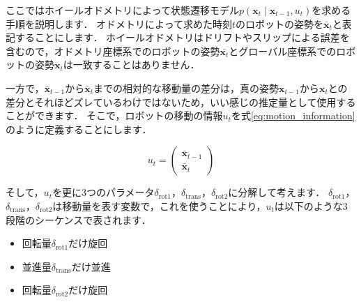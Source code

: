 \documentclass[{../../master}]{subfiles}
\begin{document}
ここではホイールオドメトリによって状態遷移モデル$p(\bm{x}_{t} \mid \bm{x}_{t-1}, u_{t})$を求める手順を説明します．
オドメトリによって求めた時刻$t$のロボットの姿勢を$\bar{\bm{x}}_{t}$と表記することにします．
ホイールオドメトリはドリフトやスリップによる誤差を含むので，オドメトリ座標系でのロボットの姿勢$\bar{\bm{x}_{t}}$とグローバル座標系でのロボットの姿勢$\bm{x}_{t}$は一致することはありません．

一方で，$\bar{\bm{x}}_{t-1}$から$\bar{\bm{x}}_{t}$までの相対的な移動量の差分は，真の姿勢$\bm{x}_{t-1}$から$\bm{x}_{t}$との差分とそれほどズレているわけではないため，いい感じの推定量として使用することができます．
そこで，ロボットの移動の情報$u_{t}$を式\ref{eq:motion_information}のように定義することにします．

\begin{equation}
  u_{t} =
  \begin{pmatrix}
    \bar{\bm{x}}_{t-1} \\
    \bar{\bm{x}}_{t}
  \end{pmatrix}
  \label{eq:motion_information}
\end{equation}

そして，$u_{t}$を更に3つのパラメータ$\delta_{\text{rot}1}$，$\delta_{\text{trans}}$，$\delta_{\text{rot}2}$に分解して考えます．
$\delta_{\text{rot}1}$，$\delta_{\text{trans}}$，$\delta_{\text{rot}2}$は移動量を表す変数で，これを使うことにより，$u_{t}$は以下のような3段階のシーケンスで表されます．

\begin{itemize}
  \item 回転量$\delta_{\text{rot}1}$だけ旋回
  \item 並進量$\delta_{\text{trans}}$だけ並進
  \item 回転量$\delta_{\text{rot}2}$だけ旋回
\end{itemize}
\end{document}
